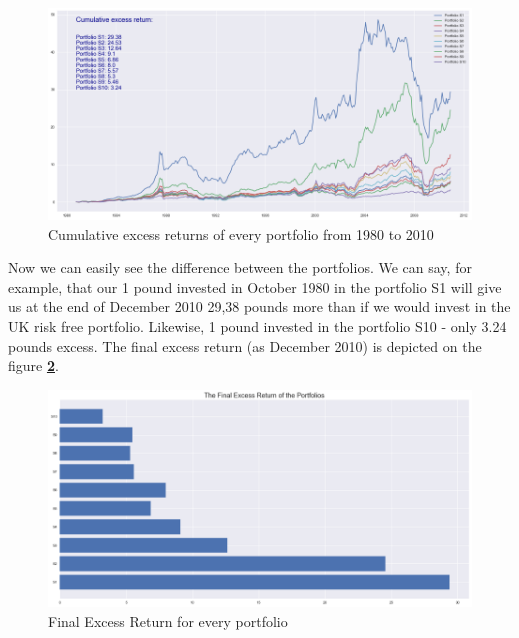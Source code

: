 \documentclass[11pt]{article}
\begin{document}
\begin{figure}[H]
    \begin{center}
        \includegraphics[scale = .9]{cumulative_excess_returns.png}
    \end{center}
    \caption{Cumulative excess returns of every portfolio from 1980 to 2010}
    \label{fig:cum_excess_port}
\end{figure}

Now we can easily see the difference between the portfolios. We can say, for example, that our 1 pound invested in October 1980 in the portfolio S1 will give us at 
the end of December 2010 29,38 pounds more than if we would invest in the UK risk free portfolio. Likewise, 1 pound invested in the portfolio S10 - only 3.24 pounds excess. 
The final excess return (as December 2010) is depicted on the figure \textbf{\ref{fig:fin_excess_port}}.
\begin{figure}[H]
    \begin{center}
        \includegraphics[scale = .9]{bar_excess_returns.png}
    \end{center}
    \caption{Final Excess Return for every portfolio}
    \label{fig:fin_excess_port}
\end{figure}
\end{document}
